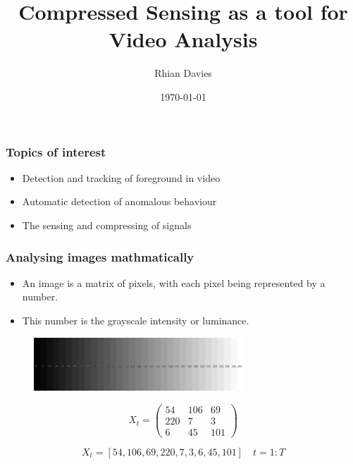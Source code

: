 \documentclass{beamer}
\begin{document}
\title{Compressed Sensing as a tool for Video Analysis}
\subtitle{}
\author{Rhian Davies}

\date{\today}

\begin{frame}[plain] 
  \titlepage
\end{frame}



\begin{frame}
  \frametitle{Topics of interest}
  \begin{itemize}
  \item Detection and tracking of foreground in video
  \item Automatic detection of anomalous behaviour
  \item The sensing and compressing of signals 
  \end{itemize}

\end{frame}

\begin{frame}
  \frametitle{Analysing images mathmatically}

  \begin{itemize}
  \item An image is a matrix of pixels, with each pixel being represented by a number. 
\item This number is the grayscale intensity or luminance.
  \end{itemize}
  \begin{figure}[h]
\label{fig:grayscale}
    \centering
    \includegraphics[height=2cm]{grayscale}
    \end{figure}

\begin{figure}[h]
  \centering
  \[X_t =    \left( \begin{array}{ccc}
54 & 106 & 69 \\
220 & 7 & 3 \\
6 & 45 & 101 \end{array} \right)\] 
\end{figure}


 \begin{equation*}
    \label{eq:3}
X_t = [54,106,69,220,7,3,6,45,101]  \quad t= 1:T  
  \end{equation*}
\end{frame}
\end{document}
